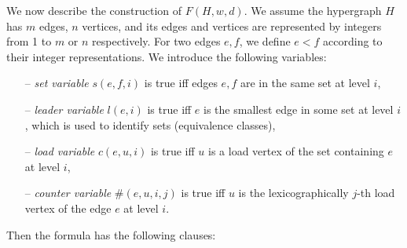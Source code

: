 \noindent
We now describe the construction of $F(H,w,d)$.
We assume the hypergraph $H$ has $m$ edges, $n$ vertices, and its edges and vertices are represented by integers from 1 to $m$ or $n$ respectively.
For two edges $e,f$, we define $e < f$ according to their integer representations.
We introduce the following variables:
\begin{itemize}
	\item[--] {\em set variable} $s(e,f,i)$ is true iff edges $e,f$ are in the same set at level $i$,
	\item[--] {\em leader variable} $l(e,i)$ is true iff $e$ is the smallest edge in some set at level $i$, which is used to identify sets (equivalence classes),
	\item[--] {\em load variable} $c(e,u,i)$ is true iff $u$ is a load vertex of the set containing $e$ at level $i$,
	\item[--] {\em counter variable} $\#(e,u,i,j)$ is true iff $u$ is the lexicographically $j$-th load vertex of the edge $e$ at level $i$.
\end{itemize} 
Then the formula has the following clauses:
